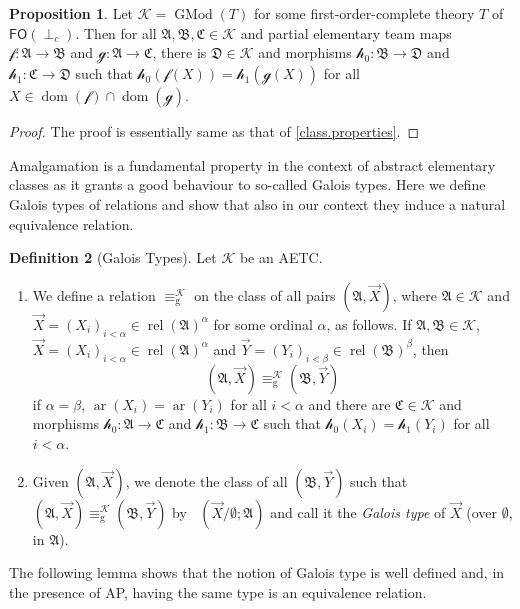 \documentclass[a4paper]{amsart}
\theoremstyle{definition}
\newtheorem{definition}{Definition}[section]
\newtheorem{proposition}[definition]{Proposition}
\theoremstyle{remark}
\newcommand{\A}{\mathcal{A}}
\newcommand{\B}{\mathcal{B}}
\newcommand{\C}{\mathcal{C}}
\newcommand{\D}{\mathcal{D}}
\DeclareMathOperator{\dom}{dom}
\newcommand\foil{\mathsf{FO}(\perp_c)}
\DeclareMathOperator{\rel}{rel}
\newcommand{\K}{\mathcal{K}}
\DeclareMathOperator{\ar}{ar}
\theoremstyle{definition}
\renewcommand{\A}{\mathfrak{A}}
\renewcommand{\B}{\mathfrak{B}}
\renewcommand{\C}{\mathfrak{C}}
\renewcommand{\D}{\mathfrak{D}}
\DeclareMathOperator{\gtype}{tp_g}
\newcommand{\f}{\mathcal{f}}
\newcommand{\g}{\mathcal{g}}
\newcommand{\h}{\mathcal{h}}
\DeclareMathOperator{\GMod}{GMod}
\begin{document}
\begin{proposition}\label{AP for elementary classes}
    Let $\K=\GMod(T)$ for some first-order-complete theory $T$ of $\foil$. Then for all $\A,\B,\C\in\K$ and partial elementary team maps $\f\colon\A\to\B$ and $\g\colon\A\to\C$, there is $\D\in\K$ and morphisms $\h_0\colon\B\to\D$ and $\h_1\colon\C\to\D$ such that $\h_0(\f(X)) = \h_1(\g(X))$ for all $X\in\dom(\f)\cap\dom(\g)$.
\end{proposition}
\begin{proof}
    The proof is essentially same as that of \cref{class.properties}.
\end{proof}

Amalgamation is a fundamental property in the context of abstract elementary classes as it grants a good behaviour to so-called Galois types. Here we define Galois types of relations and show that also in our context they induce a natural equivalence relation.


\begin{definition}[Galois Types]\label{galois=type0}
Let $\K$ be an AETC.
\begin{enumerate}
    \item We define a relation $\equiv_{\mathrm{g}}^\K$ on the class of all pairs $(\A,\vec X)$, where $\A\in\K$ and $\vec X = (X_i)_{i<\alpha}\in\rel(\A)^\alpha$ for some ordinal $\alpha$, as follows. If $\A,\B\in\K$, $\vec X = (X_i)_{i<\alpha}\in\rel(\A)^\alpha$ and $\vec Y = (Y_i)_{i<\beta}\in\rel(\B)^\beta$, then
    \[
        (\A,\vec X) \equiv_{\mathrm{g}}^\K (\B,\vec Y)
    \]
    if $\alpha = \beta$, $\ar(X_i)=\ar(Y_i)$ for all $i<\alpha$ and there are $\C\in\K$ and morphisms $\h_0\colon\A\to\C$ and $\h_1\colon\B\to\C$ such that $\h_0(X_i) = \h_1(Y_i)$ for all $i<\alpha$. 
    \item Given $(\A,\vec X)$, we denote the class of all $(\B,\vec Y)$ such that $(\A,\vec X) \equiv_{\mathrm{g}}^\K (\B,\vec Y)$ by $\gtype(\vec X /\emptyset; \A)$ and call it the \emph{Galois type} of $\vec X$ (over $\emptyset$, in $\A$).
\end{enumerate}
\end{definition}

The following lemma shows that the notion of Galois type is well defined and, in the presence of AP, having the same type is an equivalence relation.
\end{document}
